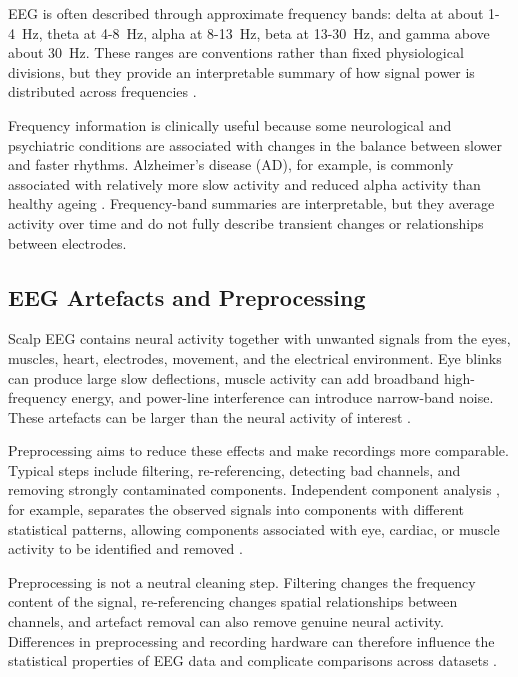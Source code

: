 EEG is often described through approximate frequency bands: delta at about 1-4~Hz, theta at 4-8~Hz, alpha at 8-13~Hz, beta at 13-30~Hz, and gamma above about 30~Hz. These ranges are conventions rather than fixed physiological divisions, but they provide an interpretable summary of how signal power is distributed across frequencies \parencite{teplanFundamentalsEegMeasurement2002}.

Frequency information is clinically useful because some neurological and psychiatric conditions are associated with changes in the balance between slower and faster rhythms. Alzheimer's disease (AD), for example, is commonly associated with relatively more slow activity and reduced alpha activity than healthy ageing \parencite{jeongEEGDynamicsAlzheimers2004,jelicQuantitativeElectroencephalographyPower1996}. Frequency-band summaries are interpretable, but they average activity over time and do not fully describe transient changes or relationships between electrodes.

\subsection{EEG Artefacts and Preprocessing}

Scalp EEG contains neural activity together with unwanted signals from the eyes, muscles, heart, electrodes, movement, and the electrical environment. Eye blinks can produce large slow deflections, muscle activity can add broadband high-frequency energy, and power-line interference can introduce narrow-band noise. These artefacts can be larger than the neural activity of interest \parencite{delormeEEGLABOpenSourceToolbox2004,bigdely-shamloPREPPipelineStandardized2015a}.

Preprocessing aims to reduce these effects and make recordings more comparable. Typical steps include filtering, re-referencing, detecting bad channels, and removing strongly contaminated components. Independent component analysis \parencite[ICA;][]{hyvarinenIndependentComponentAnalysis2000}, for example, separates the observed signals into components with different statistical patterns, allowing components associated with eye, cardiac, or muscle activity to be identified and removed \parencite{Li2022}.

Preprocessing is not a neutral cleaning step. Filtering changes the frequency content of the signal, re-referencing changes spatial relationships between channels, and artefact removal can also remove genuine neural activity. Differences in preprocessing and recording hardware can therefore influence the statistical properties of EEG data and complicate comparisons across datasets \parencite{bigdely-shamloPREPPipelineStandardized2015a,royDeepLearningBasedElectroencephalography2019}.

